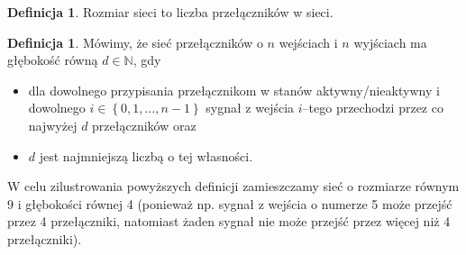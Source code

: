 \documentclass[a4paper]{article}
\newcommand{\N}{\mathbb{N}}
\newcommand{\lt}{\left}
\newcommand{\rt}{\right}
\theoremstyle{definition}
\newtheorem{df}[tw]{Definicja}
\begin{document}
\begin{df}
    Rozmiar sieci to liczba przełączników w sieci.
\end{df}

\begin{df}
    Mówimy, że sieć przełączników o \(n\) wejściach i \(n\) wyjściach ma głębokość równą \(d \in \N\), gdy 
    \begin{itemize}
        \item  dla dowolnego przypisania przełącznikom w stanów aktywny/nieaktywny i dowolnego \(i \in \lt\{ 0, 1, \ldots, n-1 \rt\} \) sygnał z wejścia \(i\)--tego przechodzi przez co najwyżej \(d\) przełączników oraz 
        \item \(d\) jest najmniejszą liczbą o tej własności.
    \end{itemize}
\end{df}

W celu zilustrowania powyższych definicji zamieszczamy sieć o rozmiarze równym 9 i głębokości równej 4 (ponieważ np. sygnał z wejścia o numerze 5 może przejść przez 4 przełączniki, natomiast żaden sygnał nie może przejść przez więcej niż 4 przełączniki). 
\end{document}
